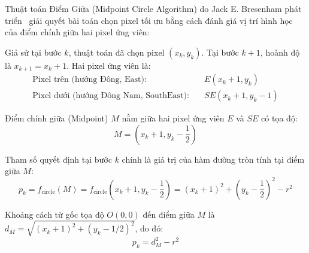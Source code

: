 Thuật toán Điểm Giữa (Midpoint Circle Algorithm) do Jack E. Bresenham phát triển~\citep{bresenham1977linear} giải quyết bài toán chọn pixel tối ưu bằng cách đánh giá vị trí hình học của điểm chính giữa hai pixel ứng viên:

Giả sử tại bước $k$, thuật toán đã chọn pixel $(x_k, y_k)$. Tại bước $k+1$, hoành độ là $x_{k+1} = x_k + 1$. Hai pixel ứng viên là:
\begin{align}
\text{Pixel trên (hướng Đông, East):} &\quad E(x_k + 1, y_k) \\
\text{Pixel dưới (hướng Đông Nam, SouthEast):} &\quad SE(x_k + 1, y_k - 1)
\end{align}

Điểm chính giữa (Midpoint) $M$ nằm giữa hai pixel ứng viên $E$ và $SE$ có tọa độ:
\begin{equation}
M = \left( x_k + 1, y_k - \frac{1}{2} \right)
\end{equation}

Tham số quyết định tại bước $k$ chính là giá trị của hàm đường tròn tính tại điểm giữa $M$:
\begin{equation}
p_k = f_{\text{circle}}(M) = f_{\text{circle}}\left( x_k + 1, y_k - \frac{1}{2} \right) = (x_k + 1)^2 + \left( y_k - \frac{1}{2} \right)^2 - r^2
\end{equation}

Khoảng cách từ gốc tọa độ $O(0, 0)$ đến điểm giữa $M$ là $d_M = \sqrt{(x_k + 1)^2 + (y_k - 1/2)^2}$, do đó:
\begin{equation}
p_k = d_M^2 - r^2
\end{equation}

